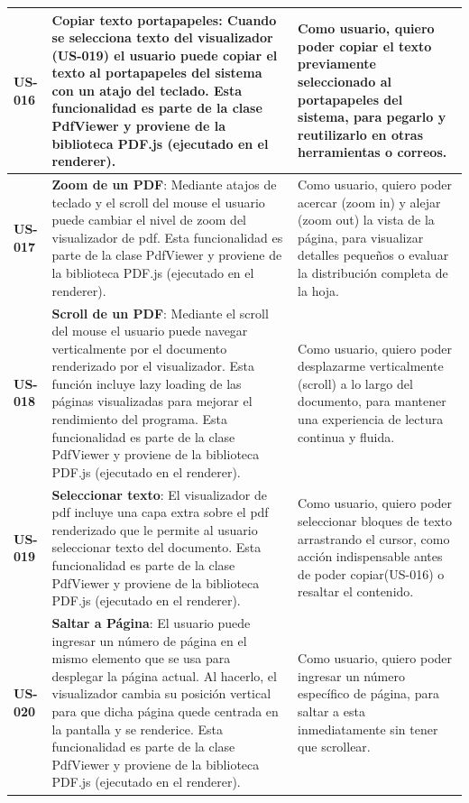 \begin{longtable}{|l||p{7cm}|p{4.5cm}|}
\hline
\textbf{US-016} & \textbf{Copiar texto portapapeles}: Cuando se selecciona texto del visualizador (US-019) el usuario puede copiar el texto al portapapeles del sistema con un atajo del teclado. Esta funcionalidad es parte de la clase PdfViewer y proviene de la biblioteca PDF.js (ejecutado en el renderer).& Como usuario, quiero poder copiar el texto previamente seleccionado al portapapeles del sistema, para pegarlo y reutilizarlo en otras herramientas o correos.\\
\hline
\textbf{US-017} & \textbf{Zoom de un PDF}: Mediante atajos de teclado y el scroll del mouse el usuario puede cambiar el nivel de zoom del visualizador de pdf.  Esta funcionalidad es parte de la clase PdfViewer y proviene de la biblioteca PDF.js (ejecutado en el renderer). & Como usuario, quiero poder acercar (zoom in) y alejar (zoom out) la vista de la página, para visualizar detalles pequeños o evaluar la distribución completa de la hoja.\\
\hline
\textbf{US-018} & \textbf{Scroll de un PDF}: Mediante el scroll del mouse el usuario puede navegar verticalmente por el documento renderizado por el visualizador. Esta función incluye lazy loading de las páginas visualizadas para mejorar el rendimiento del programa.  Esta funcionalidad es parte de la clase PdfViewer y proviene de la biblioteca PDF.js (ejecutado en el renderer). & Como usuario, quiero poder desplazarme verticalmente (scroll) a lo largo del documento, para mantener una experiencia de lectura continua y fluida.\\
\hline
\textbf{US-019} & \textbf{Seleccionar texto}: El visualizador de pdf incluye una capa extra sobre el pdf renderizado que le permite al usuario seleccionar texto del documento. Esta funcionalidad es parte de la clase PdfViewer y proviene de la biblioteca PDF.js (ejecutado en el renderer). & Como usuario, quiero poder seleccionar bloques de texto arrastrando el cursor, como acción indispensable antes de poder copiar(US-016) o resaltar el contenido.\\
\hline
\textbf{US-020} & \textbf{Saltar a Página}: El usuario puede ingresar un número de página en el mismo elemento que se usa para desplegar la página actual. Al hacerlo, el visualizador cambia su posición vertical para que dicha página quede centrada en la pantalla y se renderice. Esta funcionalidad es parte de la clase PdfViewer y proviene de la biblioteca PDF.js (ejecutado en el renderer). & Como usuario, quiero poder ingresar un número específico de página, para saltar a esta inmediatamente sin tener que scrollear.\\

\end{longtable}
